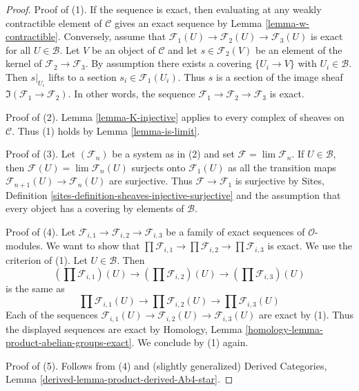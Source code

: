 \begin{proof}
Proof of (1). If the sequence is exact, then evaluating at any
weakly contractible element of $\mathcal{C}$ gives an exact
sequence by Lemma \ref{lemma-w-contractible}. Conversely, assume that
$\mathcal{F}_1(U) \to \mathcal{F}_2(U) \to \mathcal{F}_3(U)$
is exact for all $U \in \mathcal{B}$.
Let $V$ be an object of $\mathcal{C}$ and let
$s \in \mathcal{F}_2(V)$ be an element of the kernel of
$\mathcal{F}_2 \to \mathcal{F}_3$. By assumption there exists
a covering $\{U_i \to V\}$ with $U_i \in \mathcal{B}$.
Then $s|_{U_i}$ lifts to a section $s_i \in \mathcal{F}_1(U_i)$.
Thus $s$ is a section of the image sheaf
$\Im(\mathcal{F}_1 \to \mathcal{F}_2)$.
In other words, the sequence
$\mathcal{F}_1 \to \mathcal{F}_2 \to \mathcal{F}_3$
is exact.

\medskip\noindent
Proof of (2). Lemma \ref{lemma-K-injective} applies to every complex of
sheaves on $\mathcal{C}$. Thus (1) holds by Lemma \ref{lemma-is-limit}.

\medskip\noindent
Proof of (3). Let $(\mathcal{F}_n)$ be a system as in (2) and set
$\mathcal{F} = \lim \mathcal{F}_n$. If $U \in \mathcal{B}$, then
$\mathcal{F}(U) = \lim \mathcal{F}_n(U)$
surjects onto $\mathcal{F}_1(U)$ as all the transition maps
$\mathcal{F}_{n + 1}(U) \to \mathcal{F}_n(U)$ are surjective.
Thus $\mathcal{F} \to \mathcal{F}_1$ is surjective by
Sites, Definition \ref{sites-definition-sheaves-injective-surjective}
and the assumption that every object
has a covering by elements of $\mathcal{B}$.

\medskip\noindent
Proof of (4). Let
$\mathcal{F}_{i, 1} \to \mathcal{F}_{i, 2} \to \mathcal{F}_{i, 3}$
be a family of exact sequences of $\mathcal{O}$-modules.
We want to show that
$\prod \mathcal{F}_{i, 1} \to \prod \mathcal{F}_{i, 2} \to
\prod \mathcal{F}_{i, 3}$ is exact. We use the criterion of (1).
Let $U \in \mathcal{B}$. Then
$$
(\prod \mathcal{F}_{i, 1})(U) \to
(\prod \mathcal{F}_{i, 2})(U) \to
(\prod \mathcal{F}_{i, 3})(U)
$$
is the same as
$$
\prod \mathcal{F}_{i, 1}(U) \to
\prod \mathcal{F}_{i, 2}(U) \to
\prod \mathcal{F}_{i, 3}(U)
$$
Each of the sequences
$\mathcal{F}_{i, 1}(U) \to \mathcal{F}_{i, 2}(U) \to \mathcal{F}_{i, 3}(U)$
are exact by (1). Thus the displayed sequences are exact by
Homology, Lemma \ref{homology-lemma-product-abelian-groups-exact}.
We conclude by (1) again.

\medskip\noindent
Proof of (5). Follows from (4) and (slightly generalized)
Derived Categories, Lemma \ref{derived-lemma-product-derived-Ab4-star}.


\end{proof}
